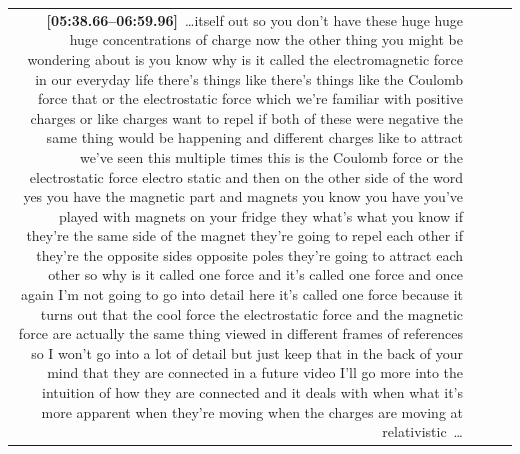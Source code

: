 \documentclass[10pt]{article}
\begin{document}
\begin{tiny}
\begin{longtable}{r p{0.3in} p{1.212in} p{3.8in}}
                                                                                                                                                                                                                                                                                                                                                                                      \textbf{[05:38.66--06:59.96]}~\ldots itself out so you don't have these huge huge huge concentrations of charge now the other thing you might be wondering about is you know why is it called the electromagnetic force in our everyday life there's things like there's things like the Coulomb force that or the electrostatic force which we're familiar with positive charges or like charges want to repel if both of these were negative the same thing would be happening and different charges like to attract we've seen this multiple times this is the Coulomb force or the electrostatic force electro static and then on the other side of the word yes you have the magnetic part and magnets you know you have you've played with magnets on your fridge they what's what you know if they're the same side of the magnet they're going to repel each other if they're the opposite sides opposite poles they're going to attract each other so why is it called one force and it's called one force and once again I'm not going to go into detail here it's called one force because it turns out that the cool force the electrostatic force and the magnetic force are actually the same thing viewed in different frames of references so I won't go into a lot of detail but just keep that in the back of your mind that they are connected in a future video I'll go more into the intuition of how they are connected and it deals with when what it's more apparent when they're moving when the charges are moving at relativistic~\ldots \\

\end{longtable}
\end{tiny}
\end{document}
